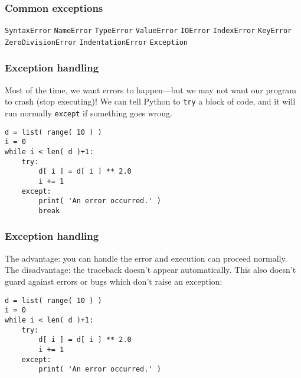 \documentclass[11pt]{beamer}
\begin{document}
\begin{frame}[fragile]
  \frametitle{Common exceptions}
  \Enlarge

  \begin{enumerate}
  \myitem  \texttt{SyntaxError}
  \myitem  \texttt{NameError}
  \myitem  \texttt{TypeError}
  \myitem  \texttt{ValueError}
  \myitem  \texttt{IOError}
  \myitem  \texttt{IndexError}
  \myitem  \texttt{KeyError}
  \myitem  \texttt{ZeroDivisionError}
  \myitem  \texttt{IndentationError}
  \myitem  \texttt{Exception}
  \end{enumerate}
\end{frame}

\begin{frame}[fragile]
  \frametitle{Exception handling}
  \Enlarge

  \begin{enumerate}
  \myitem  Most of the time, we want errors to happen---but we may not want our program to crash (stop executing)! \pause
  \myitem  We can tell Python to \texttt{try} a block of code, and it will run normally \texttt{except} if something goes wrong. \pause
  \end{enumerate}
  \begin{Verbatim}
d = list( range( 10 ) )
i = 0
while i < len( d )+1:
    try:
        d[ i ] = d[ i ] ** 2.0
        i += 1
    except:
        print( 'An error occurred.' )
        break
  \end{Verbatim}
\end{frame}

\begin{frame}[fragile]
  \frametitle{Exception handling}
  \Enlarge

  \begin{enumerate}
  \myitem  The advantage:  you can handle the error and execution can proceed normally.
  \myitem  The disadvantage:  the traceback doesn't appear automatically. \pause
  \myitem  This also doesn't guard against errors or bugs which don't raise an exception:
  \end{enumerate}
  \begin{Verbatim}
d = list( range( 10 ) )
i = 0
while i < len( d )+1:
    try:
        d[ i ] = d[ i ] ** 2.0
        i += 1
    except:
        print( 'An error occurred.' )
  \end{Verbatim}
\end{frame}
\end{document}
